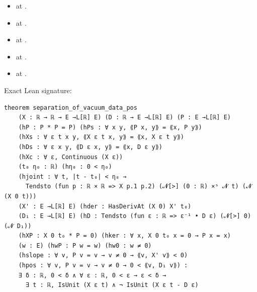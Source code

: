 \begin{theorem}[bp-261]
\begin{itemize}
\item \texttt{} at \texttt{}.
\item \texttt{} at \texttt{}.
\item \texttt{} at \texttt{}.
\item \texttt{} at \texttt{}.
\item \texttt{} at \texttt{}.
\end{itemize}
\par Exact Lean signature:
\begin{verbatim}
theorem separation_of_vacuum_data_pos
    (X : ℝ → ℝ → E →L[ℝ] E) (D : ℝ → E →L[ℝ] E) (P : E →L[ℝ] E)
    (hP : P * P = P) (hPs : ∀ x y, ⟪P x, y⟫ = ⟪x, P y⟫)
    (hXs : ∀ ε t x y, ⟪X ε t x, y⟫ = ⟪x, X ε t y⟫)
    (hDs : ∀ ε x y, ⟪D ε x, y⟫ = ⟪x, D ε y⟫)
    (hXc : ∀ ε, Continuous (X ε))
    (t₀ η₀ : ℝ) (hη₀ : 0 < η₀)
    (hjoint : ∀ t, |t - t₀| < η₀ →
      Tendsto (fun p : ℝ × ℝ => X p.1 p.2) (𝓝[>] (0 : ℝ) ×ˢ 𝓝 t) (𝓝 (X 0 t)))
    (X' : E →L[ℝ] E) (hder : HasDerivAt (X 0) X' t₀)
    (D₁ : E →L[ℝ] E) (hD : Tendsto (fun ε : ℝ => ε⁻¹ • D ε) (𝓝[>] 0) (𝓝 D₁))
    (hXP : X 0 t₀ * P = 0) (hker : ∀ x, X 0 t₀ x = 0 → P x = x)
    (w : E) (hwP : P w = w) (hw0 : w ≠ 0)
    (hslope : ∀ v, P v = v → v ≠ 0 → ⟪v, X' v⟫ < 0)
    (hpos : ∀ v, P v = v → v ≠ 0 → 0 < ⟪v, D₁ v⟫) :
    ∃ δ : ℝ, 0 < δ ∧ ∀ ε : ℝ, 0 < ε → ε < δ →
      ∃ t : ℝ, IsUnit (X ε t) ∧ ¬ IsUnit (X ε t - D ε)
\end{verbatim}
\end{theorem}

